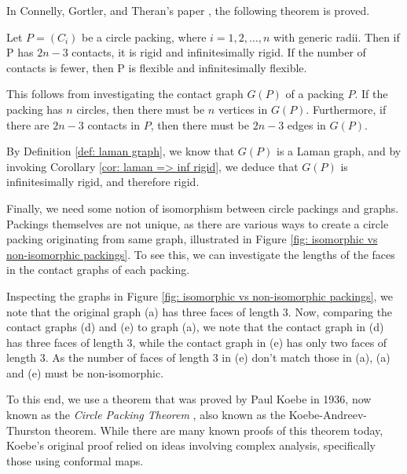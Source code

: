 \begin{flushleft}
In Connelly, Gortler, and Theran's paper \cite{sticky}, the following theorem is proved.
\end{flushleft}

\begin{theorem}
\label{thm: louis thm}
Let $P = (C_i)$ be a circle packing, where $i = 1,2,\hdots, n$ with generic radii. Then if P has $2n-3$ contacts, it is rigid and infinitesimally rigid. If the number of contacts is fewer, then P is flexible and infinitesimally flexible.
\end{theorem}

\begin{flushleft}
This follows from investigating the contact graph $G(P)$ of a packing $P$. If the packing has $n$ circles, then there must be $n$ vertices in $G(P)$. Furthermore, if there are $2n-3$ contacts in $P$, then there must be $2n-3$ edges in $G(P)$.
\end{flushleft}

\begin{flushleft}
By Definition \ref{def: laman graph}, we know that $G(P)$ is a Laman graph, and by invoking Corollary \ref{cor: laman => inf rigid}, we deduce that $G(P)$ is infinitesimally rigid, and therefore rigid. 
\end{flushleft}

\begin{flushleft}
Finally, we need some notion of isomorphism between circle packings and graphs. Packings themselves are not unique, as there are various ways to create a circle packing originating from same graph, illustrated in Figure \ref{fig: isomorphic vs non-isomorphic packings}. To see this, we can investigate the lengths of the faces in the contact graphs of each packing. 
\end{flushleft}

\begin{flushleft}
Inspecting the graphs in Figure \ref{fig: isomorphic vs non-isomorphic packings}, we note that the original graph (a) has three faces of length 3. Now, comparing the contact graphs (d) and (e) to graph (a), we note that the contact graph in (d) has three faces of length 3, while the contact graph in (e) has only two faces of length 3. As the number of faces of length 3 in (e) don't match those in (a), (a) and (e) must be non-isomorphic.
\end{flushleft}

\begin{flushleft}
To this end, we use a theorem that was proved by Paul Koebe in 1936, now known as the \textit{Circle Packing Theorem} \cite{circle_packing_theorem}, also known as the Koebe-Andreev-Thurston theorem. While there are many known proofs of this theorem today, Koebe's original proof relied on ideas involving complex analysis, specifically those using conformal maps. 
\end{flushleft} 

